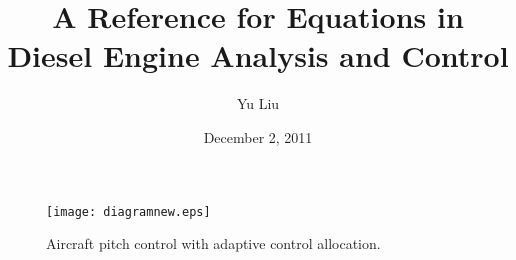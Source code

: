 \documentclass[11pt,peerreview,draftclsnofoot,onecolumn]{IEEEtran}
\title{A Reference for Equations in Diesel Engine Analysis and Control}
\author{Yu Liu}
\date{December 2, 2011}
\begin{document}
\maketitle

\setcounter{tocdepth}{3}
\tableofcontents
\vspace*{1cm}


\begin{figure}[htbp]
\centerline{\texttt{[image: diagramnew.eps]}}
\caption{Aircraft pitch control with adaptive control
  allocation.}
\label{blockdiag}
\end{figure}



\end{document}
